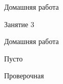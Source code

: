 \begin{homework}[number=2]
	\begin{listofex}
		\item Домашняя работа
	\end{listofex}
\end{homework}

\begin{class}[number=3]
	\begin{listofex}
		\item Занятие 3
	\end{listofex}
\end{class}

\begin{homework}[number=3]
	\begin{listofex}
		\item Домашняя работа
	\end{listofex}
\end{homework}

\begin{class}[number=4]
	\begin{listofex}
		\item Пусто
	\end{listofex}
\end{class}


\begin{exam}
	\begin{listofex}
		\item Проверочная
	\end{listofex}
\end{exam}
